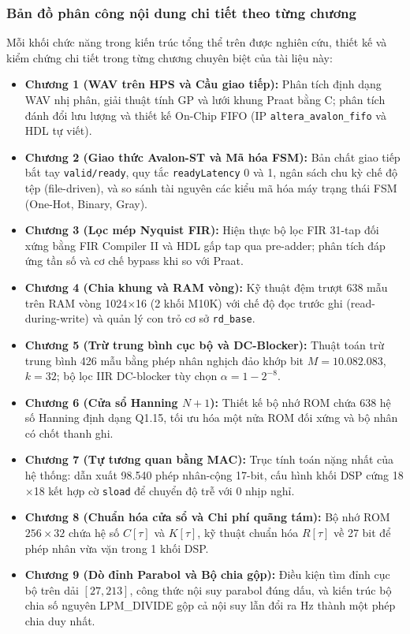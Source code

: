 \subsubsection*{Bản đồ phân công nội dung chi tiết theo từng chương}
Mỗi khối chức năng trong kiến trúc tổng thể trên được nghiên cứu, thiết kế và kiểm chứng chi tiết trong từng chương chuyên biệt của tài liệu này:
\begin{itemize}[leftmargin=1.5em, itemsep=2pt]
    \item \textbf{Chương 1 (WAV trên HPS và Cầu giao tiếp):} Phân tích định dạng WAV nhị phân, giải thuật tính GP và lưới khung Praat bằng C; phân tích đánh đổi lưu lượng và thiết kế On-Chip FIFO (IP \texttt{altera\_avalon\_fifo} và HDL tự viết).
    \item \textbf{Chương 2 (Giao thức Avalon-ST và Mã hóa FSM):} Bản chất giao tiếp bắt tay \texttt{valid/ready}, quy tắc \texttt{readyLatency} 0 và 1, ngân sách chu kỳ chế độ tệp (file-driven), và so sánh tài nguyên các kiểu mã hóa máy trạng thái FSM (One-Hot, Binary, Gray).
    \item \textbf{Chương 3 (Lọc mép Nyquist FIR):} Hiện thực bộ lọc FIR 31-tap đối xứng bằng FIR Compiler II và HDL gấp tap qua pre-adder; phân tích đáp ứng tần số và cơ chế bypass khi so với Praat.
    \item \textbf{Chương 4 (Chia khung và RAM vòng):} Kỹ thuật đệm trượt 638 mẫu trên RAM vòng 1024$\times$16 (2 khối M10K) với chế độ đọc trước ghi (read-during-write) và quản lý con trỏ cơ sở \texttt{rd\_base}.
    \item \textbf{Chương 5 (Trừ trung bình cục bộ và DC-Blocker):} Thuật toán trừ trung bình 426 mẫu bằng phép nhân nghịch đảo khớp bit $M=10.082.083$, $k=32$; bộ lọc IIR DC-blocker tùy chọn $\alpha = 1 - 2^{-8}$.
    \item \textbf{Chương 6 (Cửa sổ Hanning $N+1$):} Thiết kế bộ nhớ ROM chứa 638 hệ số Hanning định dạng Q1.15, tối ưu hóa một nửa ROM đối xứng và bộ nhân có chốt thanh ghi.
    \item \textbf{Chương 7 (Tự tương quan bằng MAC):} Trục tính toán nặng nhất của hệ thống: dẫn xuất 98.540 phép nhân-cộng 17-bit, cấu hình khối DSP cứng 18$\times$18 kết hợp cờ \texttt{sload} để chuyển độ trễ với 0 nhịp nghỉ.
    \item \textbf{Chương 8 (Chuẩn hóa cửa sổ và Chi phí quãng tám):} Bộ nhớ ROM $256 \times 32$ chứa hệ số $C[\tau]$ và $K[\tau]$, kỹ thuật chuẩn hóa $R[\tau]$ về 27 bit để phép nhân vừa vặn trong 1 khối DSP.
    \item \textbf{Chương 9 (Dò đỉnh Parabol và Bộ chia gộp):} Điều kiện tìm đỉnh cục bộ trên dải $[27, 213]$, công thức nội suy parabol đúng dấu, và kiến trúc bộ chia số nguyên LPM\_DIVIDE gộp cả nội suy lẫn đổi ra Hz thành một phép chia duy nhất.

\end{itemize}
